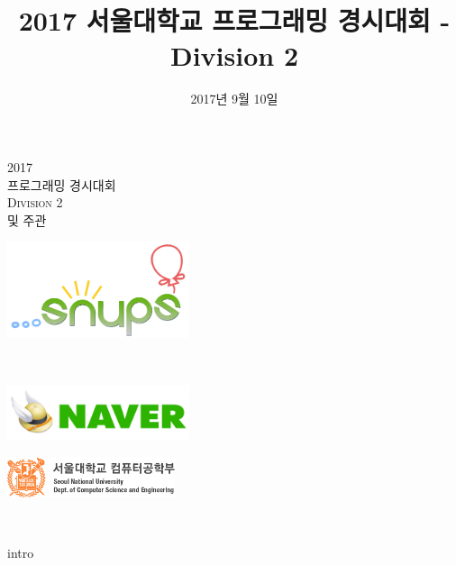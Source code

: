 \documentclass[11pt,a4paper,oneside,final]{article}
\title{2017 서울대학교 프로그래밍 경시대회 - Division 2}
\date{2017년 9월 10일}
\begin{document}
\begin{titlepage}
\begin{center}

\vspace*{3cm}

\textsc{\Huge2017}\\[0.5cm]
\textsc{ 프로그래밍 경시대회}\\[1cm]
\textsc{\Huge Division 2}\\[1cm]

\vspace{1.6cm}
\textsc{ 및 주관}\\[0.0cm]

\begin{center}
\includegraphics[width=0.4\textwidth]{snups.png}
\end{center}

\vspace{1cm}
\textsc{}\\[0.0cm]

\begin{center}
\includegraphics[width=0.4\textwidth]{naver.jpg}
\end{center}

\begin{center}
\includegraphics[width=0.37\textwidth]{snucse-logo.png}
\end{center}

\vspace{1cm}
\textsc{\Large \THEDATE}\\[0.5cm]

\vspace*{\fill}

\end{center}
\end{titlepage}

{intro}
\end{document}
